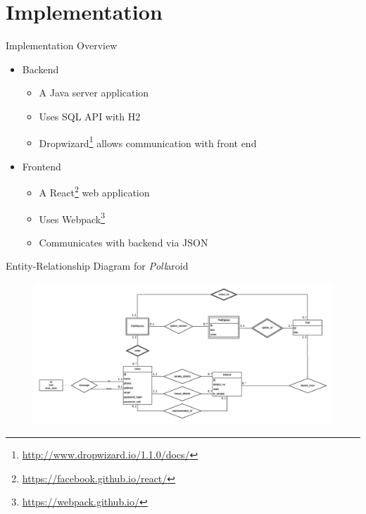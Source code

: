 \documentclass[11pt,aps,prb,groupedaddress,nofootinbib,floatfix]{beamer}
\newcommand{\pollaroid}{\emph{Poll}aroid}
\begin{document}
\section{Implementation}

%
%
\begin{frame}{Implementation Overview}
\begin{itemize}
	\item Backend
	\begin{itemize}
		\item A Java server application
		\item Uses SQL API with H2
		\item Dropwizard\footnote{\url{http://www.dropwizard.io/1.1.0/docs/}} allows communication with front end 
	\end{itemize}
	\item Frontend
	\begin{itemize}
		\item A React\footnote{\url{https://facebook.github.io/react/}} web application
		\item Uses Webpack\footnote{\url{https://webpack.github.io/}}
		\item Communicates with backend via JSON
	\end{itemize}
\end{itemize}
\end{frame}


%
%
\begin{frame}{Entity-Relationship Diagram for \pollaroid}
\begin{center}
\begin{figure}[t]
\includegraphics[scale=0.13]{er_diag.png}
\end{figure}
\end{center}
\end{frame}
\end{document}
